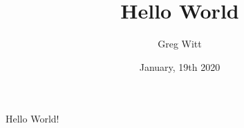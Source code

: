 \documentclass{report} %
\author{Greg Witt}
\title{Hello World}
\date{January, 19th 2020 }
\begin{document}
\maketitle 
\newpage

Hello World!
\end{document}
